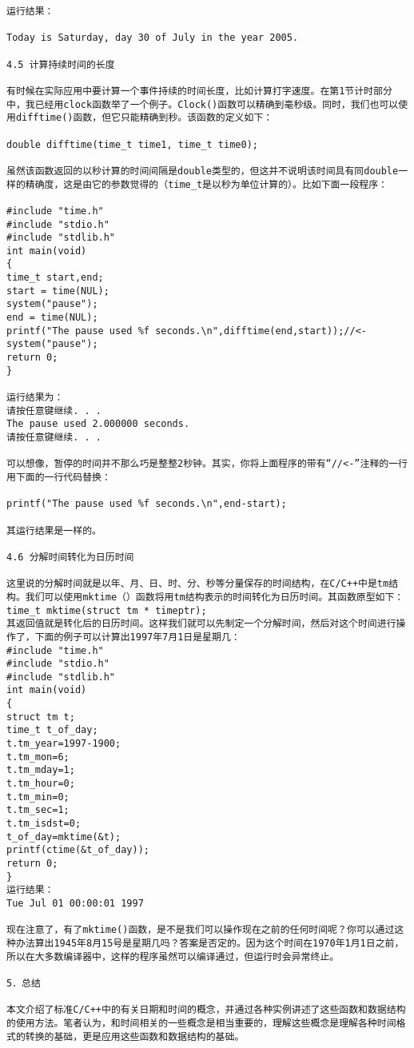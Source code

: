 \begin{verbatim}
运行结果： 

Today is Saturday, day 30 of July in the year 2005. 

4.5 计算持续时间的长度 

有时候在实际应用中要计算一个事件持续的时间长度，比如计算打字速度。在第1节计时部分中，我已经用clock函数举了一个例子。Clock()函数可以精确到毫秒级。同时，我们也可以使用difftime()函数，但它只能精确到秒。该函数的定义如下： 

double difftime(time_t time1, time_t time0); 

虽然该函数返回的以秒计算的时间间隔是double类型的，但这并不说明该时间具有同double一样的精确度，这是由它的参数觉得的（time_t是以秒为单位计算的）。比如下面一段程序： 

#include "time.h" 
#include "stdio.h" 
#include "stdlib.h" 
int main(void) 
{ 
time_t start,end; 
start = time(NUL); 
system("pause"); 
end = time(NUL); 
printf("The pause used %f seconds.\n",difftime(end,start));//<- 
system("pause"); 
return 0; 
} 

运行结果为： 
请按任意键继续. . . 
The pause used 2.000000 seconds. 
请按任意键继续. . . 

可以想像，暂停的时间并不那么巧是整整2秒钟。其实，你将上面程序的带有“//<-”注释的一行用下面的一行代码替换： 

printf("The pause used %f seconds.\n",end-start); 

其运行结果是一样的。 

4.6 分解时间转化为日历时间 

这里说的分解时间就是以年、月、日、时、分、秒等分量保存的时间结构，在C/C++中是tm结构。我们可以使用mktime（）函数将用tm结构表示的时间转化为日历时间。其函数原型如下：
time_t mktime(struct tm * timeptr); 
其返回值就是转化后的日历时间。这样我们就可以先制定一个分解时间，然后对这个时间进行操作了，下面的例子可以计算出1997年7月1日是星期几： 
#include "time.h" 
#include "stdio.h" 
#include "stdlib.h" 
int main(void) 
{ 
struct tm t; 
time_t t_of_day; 
t.tm_year=1997-1900; 
t.tm_mon=6; 
t.tm_mday=1; 
t.tm_hour=0; 
t.tm_min=0; 
t.tm_sec=1; 
t.tm_isdst=0; 
t_of_day=mktime(&t); 
printf(ctime(&t_of_day)); 
return 0; 
} 
运行结果： 
Tue Jul 01 00:00:01 1997 

现在注意了，有了mktime()函数，是不是我们可以操作现在之前的任何时间呢？你可以通过这种办法算出1945年8月15号是星期几吗？答案是否定的。因为这个时间在1970年1月1日之前，所以在大多数编译器中，这样的程序虽然可以编译通过，但运行时会异常终止。 

5．总结 

本文介绍了标准C/C++中的有关日期和时间的概念，并通过各种实例讲述了这些函数和数据结构的使用方法。笔者认为，和时间相关的一些概念是相当重要的，理解这些概念是理解各种时间格式的转换的基础，更是应用这些函数和数据结构的基础。
\end{verbatim}
